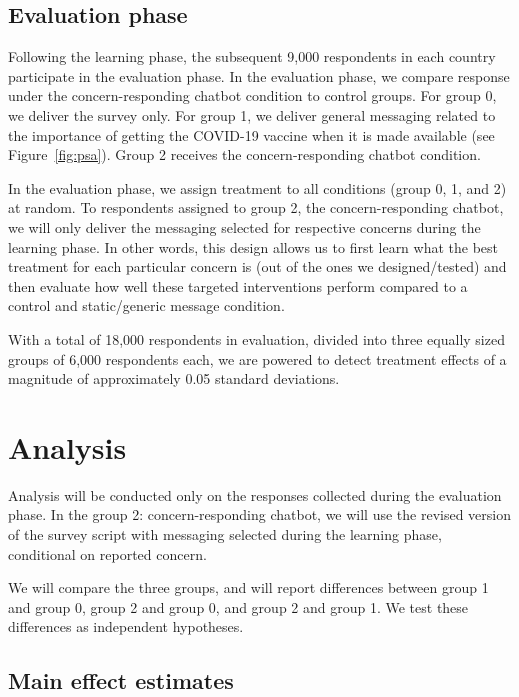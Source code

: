 \documentclass[letterpaper, 12pt, parskip=full,DIV=10]{scrartcl}
\begin{document}
\subsection{Evaluation phase}
Following the learning phase, the subsequent 9,000 respondents in each country participate in the evaluation phase. In the evaluation phase, we compare response under the concern-responding chatbot condition to control groups. For group 0, we deliver the survey only. For group 1, we deliver general messaging related to the importance of getting the COVID-19 vaccine when it is made available (see Figure~\ref{fig:psa}). Group 2 receives the concern-responding chatbot condition. 

In the evaluation phase, we assign treatment to all conditions (group 0, 1, and 2) at random. To respondents assigned to group 2, the concern-responding chatbot, we will only deliver the messaging selected for respective concerns during the learning phase. In other words, this design allows us to first learn what the best treatment for each particular concern is (out of the ones we designed/tested) and then evaluate how well these targeted interventions perform compared to a control and static/generic message condition.

With a total of 18,000 respondents in evaluation, divided into three equally sized groups of 6,000 respondents each, we are powered to detect treatment effects of a magnitude of approximately 0.05 standard deviations. 


\section{Analysis}
Analysis will be conducted only on the responses collected during the evaluation phase. In the group 2: concern-responding chatbot, we will use the revised version of the survey script with messaging selected during the learning phase, conditional on reported concern. 

We will compare the three groups, and will report differences between group 1 and group 0, group 2 and group 0, and group 2 and group 1. We test these differences as independent hypotheses. 

\subsection{Main effect estimates}
\end{document}
